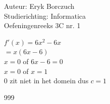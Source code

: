 \documentclass[a4paper]{article}
\begin{document}
  
\noindent \large Auteur: Eryk Borczuch \\
\noindent \large Studierichting: Informatica\\
\noindent \large Oefeningenreeks 3C nr. 1\\

\medskip

\normalsize

$f'(x) = 6x^2 -6x$\\

$= x(6x -6)$\\

$x = 0$ of $6x-6 = 0$\\

$x = 0$ of $x=1$\\

0 zit niet in het domein dus $ c = 1$\\

\begin{thebibliography}{999}
\end{thebibliography}
\end{document}
